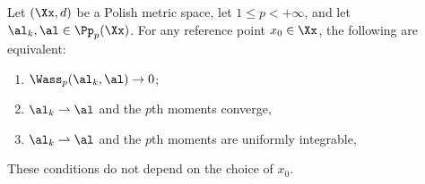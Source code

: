\begin{prop}\label{prop-wass-topology-polish}
	Let $(\Xx,d)$ be a Polish metric space, let $1\leq p<+\infty$, and let $\al_k,\al\in\Pp_p(\Xx)$. For any reference point $x_0\in\Xx$, the following are equivalent:
	\begin{enumerate}
		\item $\Wass_p(\al_k,\al)\to0$;
		\item $\al_k\rightharpoonup\al$ and the $p$th moments converge,
		\item $\al_k\rightharpoonup\al$ and the $p$th moments are uniformly integrable,
	\end{enumerate}
	These conditions do not depend on the choice of $x_0$.
\end{prop}
